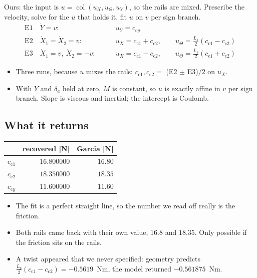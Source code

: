 \documentclass[12pt]{article}
\DeclareMathOperator{\col}{col}
\newcommand{\panel}[1]{\subsection*{\Large #1}\vspace{1mm}}
\begin{document}
Ours: the input is $u=\col(u_X,u_\Theta,u_Y)$, so the rails are mixed. Prescribe the velocity,
solve for the $u$ that holds it, fit $u$ on $v$ per sign branch.
\begin{align*}
\text{E1}\quad \dot Y=v:&\qquad u_Y=c_{\mathrm{c}y}\\
\text{E2}\quad \dot X_1=\dot X_2=v:&\qquad u_X=c_{\mathrm{c}1}+c_{\mathrm{c}2},
\qquad u_\Theta=\tfrac{L_b}{2}(c_{\mathrm{c}1}-c_{\mathrm{c}2})\\
\text{E3}\quad \dot X_1=v,\ \dot X_2=-v:&\qquad u_X=c_{\mathrm{c}1}-c_{\mathrm{c}2},
\qquad u_\Theta=\tfrac{L_b}{2}(c_{\mathrm{c}1}+c_{\mathrm{c}2})
\end{align*}
\vspace{-4mm}

\begin{itemize}[itemsep=0.4mm,topsep=1mm]
\item Three runs, because $u$ mixes the rails: $c_{\mathrm{c}1},c_{\mathrm{c}2}=$
      (E2 $\pm$ E3)$/2$ on $u_X$.
\item With $Y$ and $\delta_a$ held at zero, $M$ is constant, so $u$ is exactly affine in $v$
      per sign branch. Slope is viscous and inertial; the intercept is Coulomb.
\end{itemize}

\newpage
\panel{What it returns}

\begin{tabular}{@{}lrr@{}}
\toprule
 & recovered [N] & Garcia [N] \\
\midrule
$c_{\mathrm{c}1}$ & $16.800000$ & $16.80$ \\
$c_{\mathrm{c}2}$ & $18.350000$ & $18.35$ \\
$c_{\mathrm{c}y}$ & $11.600000$ & $11.60$ \\
\bottomrule
\end{tabular}

\begin{itemize}
\item The fit is a perfect straight line, so the number we read off really is the friction.
\item Both rails came back with their own value, $16.8$ and $18.35$. Only possible if the
      friction sits on the rails.
\item A twist appeared that we never specified: geometry predicts
      $\tfrac{L_b}{2}(c_{\mathrm{c}1}-c_{\mathrm{c}2})=-0.5619$~Nm, the model returned
      $-0.561875$~Nm.
\end{itemize}
\end{document}
